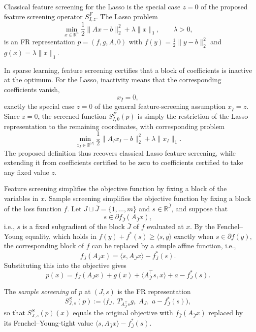 \begin{example}
\label{ex:lasso-feature}
Classical feature screening for the Lasso is the special case \(z=0\)
of the proposed feature screening operator \(S^F_{I,z}\). The Lasso
problem
\[
\min_{x\in\mathbb R^n}
\frac12\|Ax-b\|_2^2+\lambda\|x\|_1,
\qquad \lambda>0,
\]
is an FR representation \(p=(f,g,A,0)\) with
\(f(y)=\frac12\|y-b\|_2^2\) and \(g(x)=\lambda\|x\|_1\).

In sparse learning, feature screening certifies that a block of
coefficients is inactive at the optimum. For the Lasso, inactivity means
that the corresponding coefficients vanish,
\[
x_{\bar I}=0,
\]
exactly the special case \(z=0\) of the general feature-screening
assumption \(x_{\bar I}=z\). Since \(z=0\), the screened function
\(S^F_{I,0}(p)\) is simply the restriction of the Lasso representation
to the remaining coordinates, with corresponding problem
\[
\min_{x_I\in\mathbb R^{|I|}}
\frac12\|A_Ix_I-b\|_2^2+\lambda\|x_I\|_1.
\]
The proposed definition thus recovers classical Lasso feature
screening, while extending it from coefficients certified to be zero
to coefficients certified to take any fixed value \(z\).
\end{example}


Feature screening simplifies the objective function by fixing a block of the variables in \(x\). Sample screening simplifies the objective function by fixing a block of the loss function \(f\). Let
\(J\sqcup\bar J=\{1,\ldots,m\}\) and \(s\in\mathbb R^{\bar J}\), and
suppose that
\[
s\in\partial f_{\bar J}(A_{\bar J}x),
\]
i.e., \(s\) is a fixed subgradient of the block \(\bar J\) of \(f\) evaluated at
\(x\). By the Fenchel--Young equality, which holds
in \(f(y)+f^*(s)\geq\langle s,y\rangle\) exactly when \(s\in\partial
f(y)\), the corresponding block of \(f\) can be replaced by a simple affine function, i.e.,
\[
f_{\bar J}(A_{\bar J}x)
=
\langle s,A_{\bar J}x\rangle-f_{\bar J}^{*}(s).
\]
Substituting this into the objective gives
\[
p(x)
=
f_J(A_Jx)+g(x)+\langle A_{\bar J}^{\top}s,x\rangle+a-f_{\bar J}^{*}(s).
\]


\begin{definition}
The \emph{sample screening} of \(p\) at \((J,s)\) is the FR
representation
\[
S^{S}_{J,s}(p)
:=
\bigl(
f_J,\;
T^{\mathrm s}_{A_{\bar J}^{\top}s}g,\;
A_J,\;
a-f_{\bar J}^{*}(s)
\bigr),
\]
so that \(S^S_{J,s}(p)(x)\) equals the original objective with
\(f_{\bar J}(A_{\bar J}x)\) replaced by its Fenchel--Young-tight value
\(\langle s,A_{\bar J}x\rangle-f_{\bar J}^{*}(s)\).
\end{definition}


